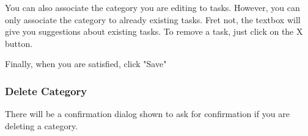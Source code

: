\documentclass[12pt, a4paper]{article}
\begin{document}
		You can also associate the category you are editing to tasks. However, you can only associate the category to already existing tasks. Fret not, the textbox will give you suggestions about existing tasks. To remove a task, just click on the X button.
		
		Finally, when you are satisfied, click "Save"
		
		\subsubsection{Delete Category}
		There will be a confirmation dialog shown to ask for confirmation if you are deleting a category.
		
\end{document}
